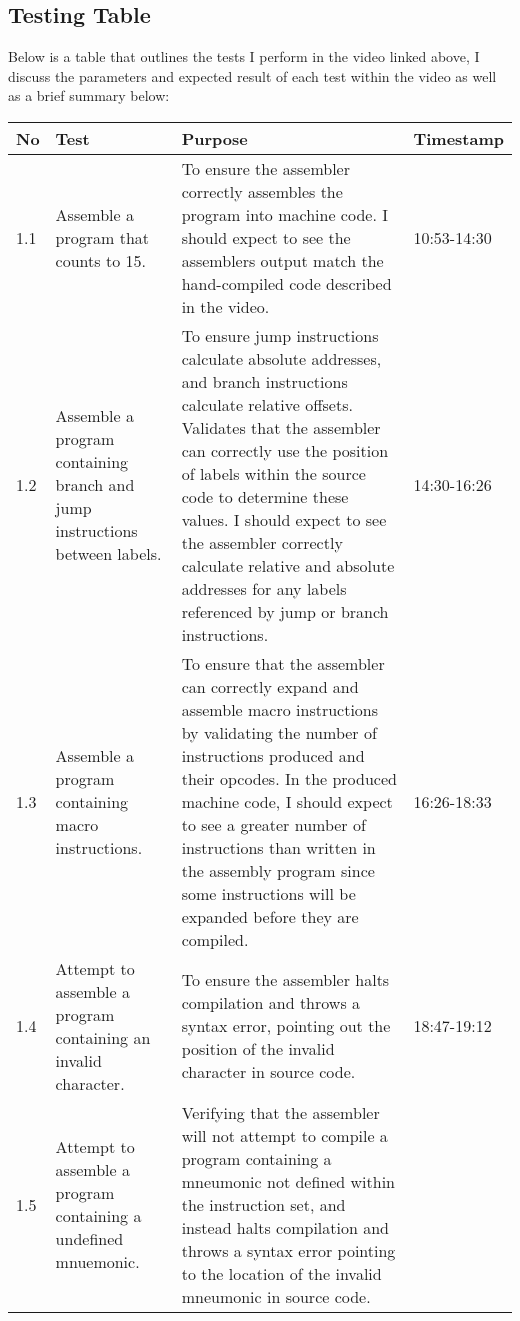 \subsection{Testing Table}

Below is a table that outlines the tests I perform in the video linked above, I discuss the parameters and expected result of each test within the video as well as a brief summary below:

\begin{longtable}{|p{1cm}|p{5cm}|p{5cm}|p{2cm}|} 
    \hline
        No & Test & Purpose & Timestamp \\ 
    \hline
        1.1
        & 
        Assemble a program that counts to 15. 
        &
        To ensure the assembler correctly assembles the program into machine code. I should expect to see the assemblers output match the hand-compiled code described in the video.
        & 
        10:53-14:30
        \\
    \hline
        1.2
        & 
        Assemble a program containing branch and jump instructions between labels.
        &
        To ensure jump instructions calculate absolute addresses, and branch instructions calculate relative offsets. Validates that the assembler can correctly use the position of labels within the source code to determine these values. I should expect to see the assembler correctly calculate relative and absolute addresses for any labels referenced by jump or branch instructions. 
        & 
        14:30-16:26
        \\
    \hline
        1.3
        & 
        Assemble a program containing macro instructions.
        &
        To ensure that the assembler can correctly expand and assemble macro instructions by validating the number of instructions produced and their opcodes. In the produced machine code, I should expect to see a greater number of instructions than written in the assembly program since some instructions will be expanded before they are compiled. 
        & 
        16:26-18:33
        \\
    \hline
        1.4
        & 
        Attempt to assemble a program containing an invalid character.
        &
        To ensure the assembler halts compilation and throws a syntax error, pointing out the position of the invalid character in source code.
        & 
        18:47-19:12
        \\
    \hline
        1.5
        & 
        Attempt to assemble a program containing a undefined mnuemonic.
        &
        Verifying that the assembler will not attempt to compile a program containing a mneumonic not defined within the instruction set, and instead halts compilation and throws a syntax error pointing to the location of the invalid mneumonic in source code. 

\end{longtable}
